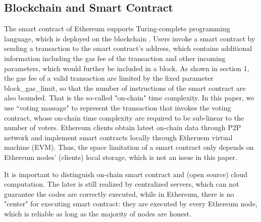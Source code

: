 \subsection{Blockchain and Smart Contract}
The smart contract of Ethereum supports Turing-complete programming language, which is deployed on the blockchain \cite{bocek2018smart}. Users invoke a smart contract by sending a transaction to the smart contract's address, which contains additional information including the gas fee of the transaction and other incoming parameters, which would further be included in a block. As shown in section 1, the gas fee of a valid transaction are limited by the fixed parameter block\_gas\_limit, so that the number of instructions of the smart contract are also bounded. That is the so-called "on-chain" time complexity. In this paper, we use ``voting massage" to represent the transaction that invokes the voting contract, whose on-chain time complexity are required to be sub-linear to the number of voters.  Ethereum clients obtain latest on-chain data through P2P network and implement smart contracts locally through Etheruem virtual machine (EVM). Thus, the space limitation of a smart contract only depends on Ethereum nodes' (clients) local storage, which is not an issue in this paper.

It is important to distinguish on-chain smart contract and (open source) cloud computation. The later is still realized by centralized servers, which can not guarantee the codes are correctly executed, while in Ethereum, there is no "center" for executing smart contract: they are executed by every Ethereum node, which is reliable as long as the majority of nodes are honest.

